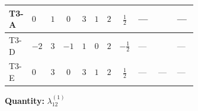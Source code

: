\documentclass[8pt]{article}
\begin{document}
\begin{landscape}
\begin{longtable}{@{}llcccccc >{\raggedright\arraybackslash}p{0.21\linewidth} >{\raggedright\arraybackslash}p{0.21\linewidth} >{\raggedright\arraybackslash}p{0.21\linewidth}@{}}
\midrule
T3-A & $0$ & $1$ & $0$ & $3$ & $1$ & $2$ & $\frac{1}{2}$ & --- & \scriptsize\adjustbox{max width=\linewidth}{$\begin{gathered} +4 {\lambda_5} \left({\lambda_5}\right)^{*}\end{gathered}$} & --- \\
\midrule
T3-D & $-2$ & $3$ & $-1$ & $1$ & $0$ & $2$ & $-\frac{1}{2}$ & --- & \scriptsize\adjustbox{max width=\linewidth}{$\begin{gathered} +4 {\lambda_5} \left({\lambda_5}\right)^{*}\end{gathered}$} & --- \\
\midrule
T3-E & $0$ & $3$ & $0$ & $3$ & $1$ & $2$ & $\frac{1}{2}$ & --- & --- & --- \\
\midrule
\bottomrule
\end{longtable}
\clearpage
\noindent\textbf{Quantity: }$\lambda_{12}^{(1)}$\par\smallskip

\end{landscape}
\end{document}

